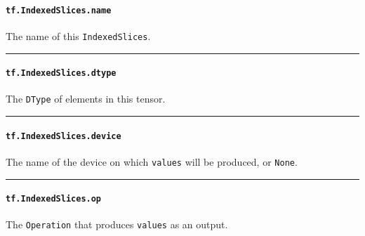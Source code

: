 \paragraph{\texorpdfstring{\lstinline{tf.IndexedSlices.name}
}{tf.IndexedSlices.name }}\label{tf.indexedslices.name}

The name of this \lstinline{IndexedSlices}.

\begin{center}\rule{0.5\linewidth}{\linethickness}\end{center}

\paragraph{\texorpdfstring{\lstinline{tf.IndexedSlices.dtype}
}{tf.IndexedSlices.dtype }}\label{tf.indexedslices.dtype}

The \lstinline{DType} of elements in this tensor.

\begin{center}\rule{0.5\linewidth}{\linethickness}\end{center}

\paragraph{\texorpdfstring{\lstinline{tf.IndexedSlices.device}
}{tf.IndexedSlices.device }}\label{tf.indexedslices.device}

The name of the device on which \lstinline{values} will be produced, or
\lstinline{None}.

\begin{center}\rule{0.5\linewidth}{\linethickness}\end{center}

\paragraph{\texorpdfstring{\lstinline{tf.IndexedSlices.op}
}{tf.IndexedSlices.op }}\label{tf.indexedslices.op}

The \lstinline{Operation} that produces \lstinline{values} as an output.

